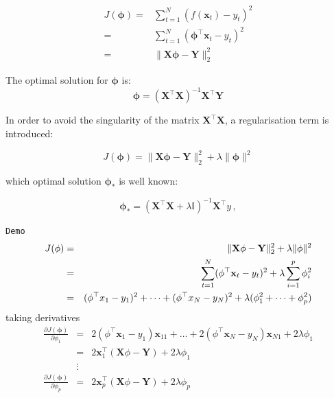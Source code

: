 \begin{eqnarray*}
\label{eq:lsm}
 J(\mathbf{\phi}) =& \sum_{t=1}^N (f(\mathbf{x}_t)-y_t)^2 \\
 =& \sum_{t=1}^N (\mathbf{\phi}^\top {\mathbf{x}}_t-y_t)^2 \\
 =& \| \mathbf{X}\mathbf{\phi} - \mathbf{Y} \|_2^2 
\end{eqnarray*}

The optimal solution for $\mathbf{\phi}$ is:
\begin{equation*}
\mathbf{\phi}=(\mathbf{X}^\top
\mathbf{X})^{-1}\mathbf{X}^\top \mathbf{Y}
\end{equation*}

In order to avoid the singularity of the matrix $\mathbf{X}^\top \mathbf{X}$, a regularisation term is introduced: 

\begin{equation*}
\label{eq:problem} 
J(\mathbf{\phi}) =  \| \mathbf{X}\mathbf{\phi} - \mathbf{Y} \|_2^2  + \lambda
 \| \mathbf{\phi}\| ^2
\end{equation*}

\noindent which optimal solution $\mathbf{\phi}_*$ is well known: 

\begin{equation*}
\label{eq:optsolRR}
\mathbf{\phi}_*=(\mathbf{X}^\top \mathbf{X}+\lambda \mathbb{I})^{-1}\mathbf{X}^\top y \, ,
\end{equation*}

\texttt{Demo}
\begin{eqnarray*}
J(\mathbf{\phi}) &=&  \| \mathbf{X}\mathbf{\phi} - \mathbf{Y} \|_2^2  + \lambda
 \| \mathbf{\phi}\| ^2 \\
 &=&  \sum_{t=1}^N (\mathbf{\phi}^\top {\bf x}_t-y_t)^2 + \lambda \sum_{i=1}^p \phi_i^2 \\
 &=& (\phi^\top x_1-y_1)^2 + \dots + (\phi^\top x_N-y_N)^2 + \lambda (\phi_1^2+\dots+\phi_p^2)
\end{eqnarray*}
\noindent taking derivatives
 \begin{eqnarray*}
 \frac{\partial J(\mathbf{\phi})}{\partial \phi_1}&=& 
 2(\phi^\top \mathbf{x}_1-y_1)\mathbf{x}_{11} + \dots + 2(\phi^\top \mathbf{x}_N-y_N)\mathbf{x}_{N1} + 2\lambda \phi_1 \\
 &=& 2\mathbf{x}_1^\top(\mathbf{X}\phi-\mathbf{Y}) + 2\lambda\phi_1\\
& \vdots &\\
  \frac{\partial J(\mathbf{\phi})}{\partial \phi_p}&=& 
 2\mathbf{x}_p^\top(\mathbf{X}\phi-\mathbf{Y}) + 2\lambda\phi_p 
\end{eqnarray*}

